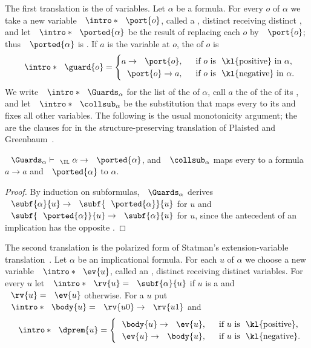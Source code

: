 \AP The first translation is  the  of
variables. Let $\alpha$ be a formula. For every  $o$ of $\alpha$
we take a new variable $\intro*\port{o}$, called a , distinct
 receiving distinct , and let $\intro*\ported{\alpha}$
be the result of replacing each  $o$ by $\port{o}$; thus
$\ported{\alpha}$ is . If $a$ is the variable at $o$, the
 of $o$ is
\[
\intro*\guard{o}=
\begin{cases}
a\to\port{o}, & \text{if $o$ is \kl{positive} in $\alpha$},\\
\port{o}\to a, & \text{if $o$ is \kl{negative} in $\alpha$}.
\end{cases}
\]
\AP We write $\intro*\Guards_\alpha$ for the list of the  of
$\alpha$, call $a$ the  of the  of its
, and let $\intro*\collsub_\alpha$ be the substitution that
maps every  to its  and fixes all other variables. The
following is the usual monotonicity argument; the  are the
clauses for  in the structure-preserving translation of Plaisted
and Greenbaum~\cite{PG86}.

\begin{lemma}\label{lem:port}
$\Guards_\alpha\vdash_{\IL}\alpha\to\ported{\alpha}$, and $\collsub_\alpha$
maps every  to a formula $a\to a$ and $\ported{\alpha}$ to
$\alpha$.
\end{lemma}
\begin{proof}
By induction on subformulas, $\Guards_\alpha$ derives
$\subf{\alpha}{u}\to\subf{\ported{\alpha}}{u}$ for  $u$ and
$\subf{\ported{\alpha}}{u}\to\subf{\alpha}{u}$ for  $u$, since
the antecedent of an implication has the opposite .
\end{proof}

\AP The second translation is the polarized form of Statman's
extension-variable translation~\cite{Sta79,PG86,Min90}. Let $\alpha$ be an
implicational formula. For each  $u$ of $\alpha$ we
choose a new variable $\intro*\ev{u}$, called an ,
distinct  receiving distinct variables. For every
 $u$ let $\intro*\rv{u}=\subf{\alpha}{u}$ if $u$ is a
 and $\rv{u}=\ev{u}$ otherwise. \AP For a  $u$ put $\intro*\body{u}=\rv{u0}\to\rv{u1}$ and
\[
\intro*\dprem{u}=
\begin{cases}
\body{u}\to\ev{u}, & \text{if $u$ is \kl{positive}},\\
\ev{u}\to\body{u}, & \text{if $u$ is \kl{negative}}.
\end{cases}
\]

